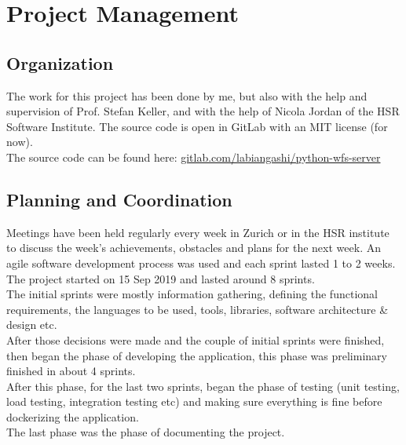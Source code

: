 \chapter{Project Management}
\section{Organization}
The work for this project has been done by me, but also with the help and supervision of Prof. Stefan Keller, and with the help of Nicola Jordan of the HSR Software Institute.
The source code is open in GitLab with an MIT license (for now).\\
The source code can be found here: \href{https://gitlab.com/labiangashi/python-wfs-server}{gitlab.com/labiangashi/python-wfs-server}
\section{Planning and Coordination}
Meetings have been held regularly every week in Zurich or in the HSR institute to discuss the week's achievements, obstacles and plans for the next week. An agile software development process was used and each sprint lasted 1 to 2 weeks.
The project started on 15 Sep 2019 and lasted around 8 sprints.\\
\newline
The initial sprints were mostly information gathering, defining the functional requirements, the languages to be used, tools, libraries, software architecture \& design etc.\\
After those decisions were made and the couple of initial sprints were finished, then began the phase of developing the application, this phase was preliminary finished in about 4 sprints.\\
After this phase, for the last two sprints, began the phase of testing (unit testing, load testing, integration testing etc) and making sure everything is fine before dockerizing the application.\\
The last phase was the phase of documenting the project.
